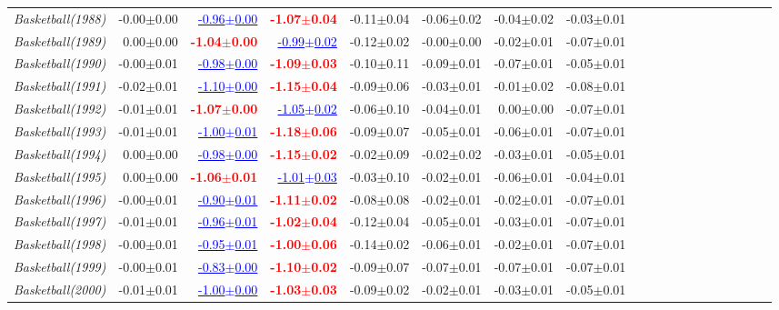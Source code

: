 \documentclass[nohyperref]{article}
\theoremstyle{plain}
\theoremstyle{definition}
\theoremstyle{remark}
\newcommand{\red}[1]{\textcolor{red}{\textbf{#1}}}
\newcommand{\blue}[1]{\textcolor{blue}{\underline{#1}}}
\begin{document}
\begin{table*}[!ht]
{\begin{tabular}{lrrrrrrrrrrrrrrrrrr}
			{\it Basketball(1988)} & -0.00$\pm$0.00 & \blue{-0.96$\pm$0.00} & \red{-1.07$\pm$0.04} & -0.11$\pm$0.04 & -0.06$\pm$0.02 & -0.04$\pm$0.02 & -0.03$\pm$0.01 \\
			{\it Basketball(1989)} & 0.00$\pm$0.00 & \red{-1.04$\pm$0.00} & \blue{-0.99$\pm$0.02} & -0.12$\pm$0.02 & -0.00$\pm$0.00 & -0.02$\pm$0.01 & -0.07$\pm$0.01 \\
			{\it Basketball(1990)} & -0.00$\pm$0.01 & \blue{-0.98$\pm$0.00} & \red{-1.09$\pm$0.03} & -0.10$\pm$0.11 & -0.09$\pm$0.01 & -0.07$\pm$0.01 & -0.05$\pm$0.01 \\
			{\it Basketball(1991)} & -0.02$\pm$0.01 & \blue{-1.10$\pm$0.00} & \red{-1.15$\pm$0.04} & -0.09$\pm$0.06 & -0.03$\pm$0.01 & -0.01$\pm$0.02 & -0.08$\pm$0.01 \\
			{\it Basketball(1992)} & -0.01$\pm$0.01 & \red{-1.07$\pm$0.00} & \blue{-1.05$\pm$0.02} & -0.06$\pm$0.10 & -0.04$\pm$0.01 & 0.00$\pm$0.00 & -0.07$\pm$0.01 \\
			{\it Basketball(1993)} & -0.01$\pm$0.01 & \blue{-1.00$\pm$0.01} & \red{-1.18$\pm$0.06} & -0.09$\pm$0.07 & -0.05$\pm$0.01 & -0.06$\pm$0.01 & -0.07$\pm$0.01 \\
			{\it Basketball(1994)} & 0.00$\pm$0.00 & \blue{-0.98$\pm$0.00} & \red{-1.15$\pm$0.02} & -0.02$\pm$0.09 & -0.02$\pm$0.02 & -0.03$\pm$0.01 & -0.05$\pm$0.01 \\
			{\it Basketball(1995)} & 0.00$\pm$0.00 & \red{-1.06$\pm$0.01} & \blue{-1.01$\pm$0.03} & -0.03$\pm$0.10 & -0.02$\pm$0.01 & -0.06$\pm$0.01 & -0.04$\pm$0.01 \\
			{\it Basketball(1996)} & -0.00$\pm$0.01 & \blue{-0.90$\pm$0.01} & \red{-1.11$\pm$0.02} & -0.08$\pm$0.08 & -0.02$\pm$0.01 & -0.02$\pm$0.01 & -0.07$\pm$0.01 \\
			{\it Basketball(1997)} & -0.01$\pm$0.01 & \blue{-0.96$\pm$0.01} & \red{-1.02$\pm$0.04} & -0.12$\pm$0.04 & -0.05$\pm$0.01 & -0.03$\pm$0.01 & -0.07$\pm$0.01 \\
			{\it Basketball(1998)} & -0.00$\pm$0.01 & \blue{-0.95$\pm$0.01} & \red{-1.00$\pm$0.06} & -0.14$\pm$0.02 & -0.06$\pm$0.01 & -0.02$\pm$0.01 & -0.07$\pm$0.01 \\
			{\it Basketball(1999)} & -0.00$\pm$0.01 & \blue{-0.83$\pm$0.00} & \red{-1.10$\pm$0.02} & -0.09$\pm$0.07 & -0.07$\pm$0.01 & -0.07$\pm$0.01 & -0.07$\pm$0.01 \\
			{\it Basketball(2000)} & -0.01$\pm$0.01 & \blue{-1.00$\pm$0.00} & \red{-1.03$\pm$0.03} & -0.09$\pm$0.02 & -0.02$\pm$0.01 & -0.03$\pm$0.01 & -0.05$\pm$0.01 \\

\end{tabular}}
\end{table*}
\end{document}

